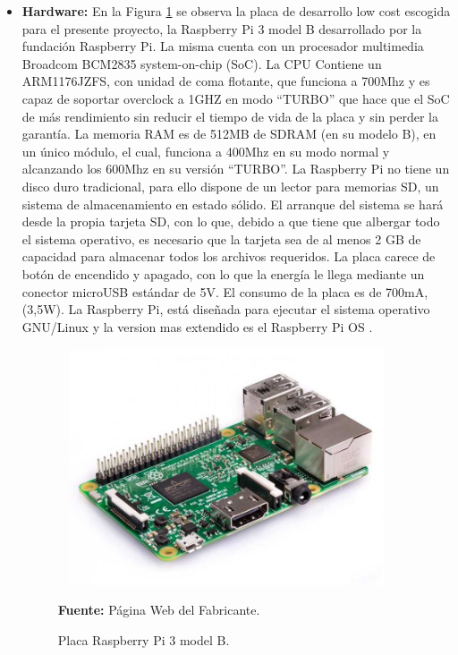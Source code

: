 \begin{itemize}
    \item \textbf{Hardware:}
    En la Figura \ref{fig:4.4} se observa la placa de desarrollo low cost escogida para el presente proyecto, la Raspberry Pi 3 model B desarrollado por la fundación Raspberry Pi. La misma cuenta con un procesador multimedia Broadcom BCM2835 system-on-chip (SoC).
    \newline
    \hfill
    La CPU Contiene un ARM1176JZFS, con unidad de coma flotante, que funciona a 700Mhz y es capaz de soportar overclock a 1GHZ en modo “TURBO” que hace que el SoC de más rendimiento sin reducir el tiempo de vida de la placa y sin perder la garantía. 
    La memoria RAM es de 512MB de SDRAM (en su modelo B), en un único módulo, el cual, funciona a 400Mhz en su modo normal y alcanzando los 600Mhz en su versión “TURBO”.
    La  Raspberry Pi no tiene un disco duro tradicional, para ello dispone de un lector para memorias SD, un sistema de almacenamiento en estado sólido. El arranque del sistema se hará desde la propia tarjeta SD, con lo que, debido a que tiene que albergar todo el sistema operativo, es necesario que la tarjeta sea de al menos 2 GB de capacidad para almacenar todos los archivos requeridos.
    La placa carece de botón de encendido y apagado, con lo que la energía le llega mediante un conector microUSB estándar de 5V. El consumo de la placa es de 700mA, (3,5W).
    La Raspberry Pi, está diseñada para ejecutar el sistema operativo GNU/Linux y la version mas extendido es el Raspberry Pi OS .
    \begin{figure}[ht]
        \centering
        \includegraphics[width=100mm, height=70mm]{Imagenes/2021/imag35.jpg}
        \caption[Placa Raspberry Pi 3 model B]{Placa Raspberry Pi 3 model B.}{\textbf{Fuente:} Página Web del Fabricante.}
        \label{fig:4.4}
    \end{figure}


\end{itemize}
